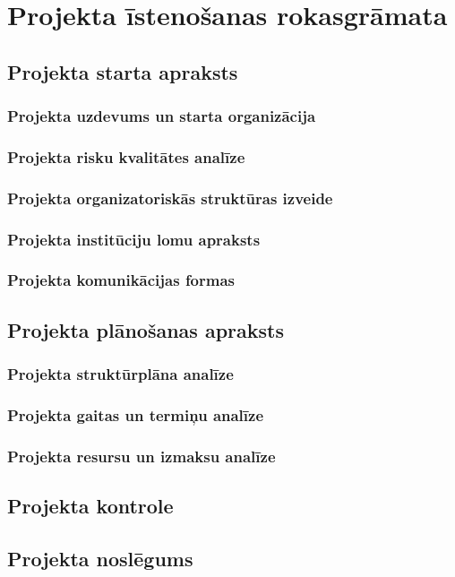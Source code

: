 \chapter{Projekta īstenošanas rokasgrāmata}
\section{Projekta starta apraksts}
\subsection{Projekta uzdevums un starta organizācija}
\subsection{Projekta risku kvalitātes analīze}
\subsection{Projekta organizatoriskās struktūras izveide}   
\subsection{Projekta institūciju lomu apraksts}
\subsection{Projekta komunikācijas formas}
\section{Projekta plānošanas apraksts}
\subsection{Projekta struktūrplāna analīze}
\subsection{Projekta gaitas un termiņu analīze}
\subsection{Projekta resursu un izmaksu analīze}
\section{Projekta kontrole}
\section{Projekta noslēgums}

